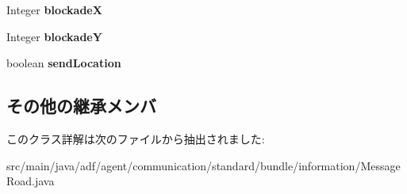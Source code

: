 \begin{DoxyCompactItemize}
Integer {\bfseries blockadeX}
\item 
\hypertarget{classadf_1_1agent_1_1communication_1_1standard_1_1bundle_1_1information_1_1MessageRoad_a8ceae6dcf313a74e5e0550b776c29338}{}\label{classadf_1_1agent_1_1communication_1_1standard_1_1bundle_1_1information_1_1MessageRoad_a8ceae6dcf313a74e5e0550b776c29338} 
Integer {\bfseries blockadeY}
\item 
\hypertarget{classadf_1_1agent_1_1communication_1_1standard_1_1bundle_1_1information_1_1MessageRoad_a85efc0c078f8fea9e0bc639d0d293d90}{}\label{classadf_1_1agent_1_1communication_1_1standard_1_1bundle_1_1information_1_1MessageRoad_a85efc0c078f8fea9e0bc639d0d293d90} 
boolean {\bfseries send\+Location}
\end{DoxyCompactItemize}
\subsection*{その他の継承メンバ}


このクラス詳解は次のファイルから抽出されました\+:\begin{DoxyCompactItemize}
\item 
src/main/java/adf/agent/communication/standard/bundle/information/Message\+Road.\+java\end{DoxyCompactItemize}
